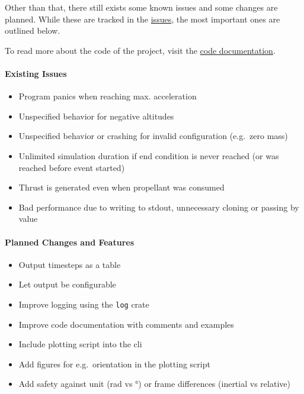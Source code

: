 Other than that, there still exists some known issues and some changes are
planned. While these are tracked in the
\href{https://github.com/TiborVoelcker/post/issues}{issues}, the most important
ones are outlined below.

To read more about the code of the project, visit the
\href{missing-link}{code documentation}.

\paragraph{Existing Issues}\label{existing-issues}

\begin{itemize}
  \item Program panics when reaching max. acceleration
  \item Unspecified behavior for negative altitudes
  \item Unspecified behavior or crashing for invalid configuration (e.g.~zero
        mass)
  \item Unlimited simulation duration if end condition is never reached (or was
        reached before event started)
  \item Thrust is generated even when propellant was consumed
  \item Bad performance due to writing to stdout, unnecessary cloning or passing
        by value
\end{itemize}

\paragraph{Planned Changes and Features}\label{planned-changes-and-features}

\begin{itemize}
  \item Output timesteps as a table
  \item Let output be configurable
  \item Improve logging using the \lstinline{log} crate
  \item Improve code documentation with comments and examples
  \item Include plotting script into the \gls{cli}
  \item Add figures for e.g.~orientation in the plotting script
  \item Add safety against unit (rad vs °) or frame differences (inertial vs
        relative)
\end{itemize}

